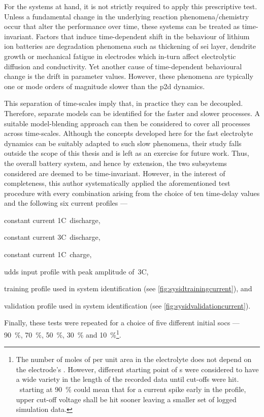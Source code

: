 For the systems at hand, it is  not strictly required to apply this prescriptive
test. Unless a fundamental change in the underlying reaction phenomena/chemistry
occur that  alter the  performance over  time, these systems  can be  treated as
time-invariant. Factors  that induce  time-dependent shift  in the  behaviour of
lithium ion batteries are degradation  phenomena such as thickening of \gls{sei}
layer, dendrite growth or mechanical  fatigue in electrodes which in-turn affect
electrolytic  diffusion and  conductivity. Yet  another cause  of time-dependent
behavioural change  is the drift  in parameter values. However,  these phenomena
are  typically  one or  mode  orders  of  magnitude  slower than  the  \gls{p2d}
dynamics.

This separation  of time-scales imply that, in
practice they can be decoupled. Therefore, separate models can be identified for
the faster and slower processes. A  suitable model-blending approach can then be
considered  to cover  all processes  across time-scales.  Although the  concepts
developed here for the fast electrolyte dynamics can be suitably adapted to such
slow phenomena, their study  falls outside the scope of this  thesis and is left
as an exercise for  future work. Thus, the overall battery  system, and hence by
extension,  the  two subsystems  considered  are  deemed to  be  time-invariant.
However, in the interest of completeness, this author systematically applied the
aforementioned test procedure with every  combination arising from the choice of
ten time-delay values and the following six current profiles ---
\begin{enumerate*}[label=\emph{\alph*})]
    \item constant current 1C~discharge,
    \item constant current 3C~discharge,
    \item constant current 1C~charge,
    \item \gls{udds} input profile with peak amplitude of~3C,
    \item training profile used in system identification (see \cref{fig:sysidtrainingcurrent}), and
    \item validation profile used in system identification (see \cref{fig:sysidvalidationcurrent}).
\end{enumerate*}
Finally,  these tests  were  repeated for  a choice  of  five different  initial
\glspl{soc}   ---   \SI{90}{\percent},   \SI{70}{\percent},   \SI{50}{\percent},
\SI{30}{\percent}  and \SI{10}{\percent}\footnote{\label{fn:socstart}The  number
of  moles  of   per  unit  area  in  the  electrolyte does  not  depend
on  the  electrode's .  However,  different  starting point  of
s were considered  to have a wide variety in  the length of the
recorded  data until  cut-offs  were hit.  \eg~starting at  \SI{90}{\percent}
 could  mean that  for a  current spike  early in  the profile,
upper  cut-off voltage  shall be  hit  sooner leaving  a smaller  set of  logged
simulation data.}.

